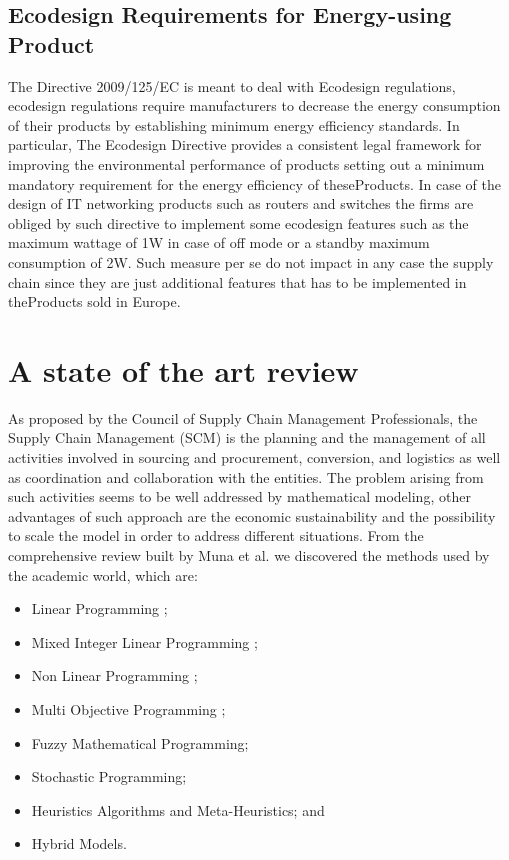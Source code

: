 \documentclass{article}
\begin{document}
\subsection{Ecodesign Requirements for Energy-using Product}
  The Directive 2009/125/EC is meant to deal with Ecodesign regulations, ecodesign regulations require manufacturers to decrease the energy consumption of their products by establishing minimum energy efficiency standards. In particular, The Ecodesign Directive provides a consistent legal framework for improving the environmental performance of products setting out a minimum mandatory requirement for the energy efficiency of theseProducts. In case of the design of IT networking products such as routers and switches the firms are obliged by such directive to implement some ecodesign features such as the maximum wattage of 1W in case of off mode or a standby maximum consumption of 2W. Such measure per se do not impact in any case the supply chain since they are just additional features that has to be implemented in theProducts sold in Europe.

\section{A state of the art review }
  As proposed by the Council of Supply Chain Management Professionals, the Supply Chain Management (SCM) is the planning and the management of all activities involved in sourcing and procurement, conversion, and logistics as well as coordination and collaboration with the entities. The problem arising from such activities seems to be well addressed by mathematical modeling, other advantages of such approach are the economic sustainability and the possibility to scale the model in order to address different situations.
  From the comprehensive review built by Muna et al. \cite{mula_mathematical_2010} we discovered the methods used by the academic world, which are:
  \begin{itemize}
    \item Linear Programming \cite{jung_order_2008};
    \item Mixed Integer Linear Programming \cite{romo_optimizing_2009};
    \item Non Linear Programming \cite{benjamin_analysis_1989};
    \item Multi Objective Programming \cite{torabi_interactive_2008};
    \item Fuzzy Mathematical Programming;
    \item Stochastic Programming;
    \item Heuristics Algorithms and Meta-Heuristics; and
    \item Hybrid Models.
  \end{itemize}
\end{document}
